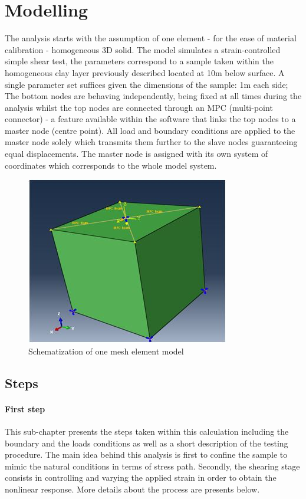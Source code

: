 \documentclass[10pt,a4paper]{report}
\begin{document}
\section{Modelling}

The analysis starts with the assumption of one element - for the ease of material calibration - homogeneous 3D solid. The model simulates a strain-controlled simple shear test, the parameters correspond to a sample taken within the homogeneous clay layer previously described located at 10m below surface. A single parameter set suffices given the dimensions of the sample: 1m each side; The bottom nodes are behaving independently, being fixed at all times during the analysis whilst the top nodes are connected through an MPC (multi-point connector) - a feature available within the software that links the top nodes to a master node (centre point). All load and boundary conditions are applied to the master node solely which transmits them further to the slave nodes guaranteeing equal displacements. The master node is assigned with its own system of coordinates which corresponds to the whole model system.

\begin{figure}[h!]
	\centering
	\includegraphics[width=0.7\linewidth]{"1dmodel"}
	\caption{Schematization of one mesh element model }
	\label{cube}
\end{figure}

\subsection{Steps}
\paragraph{First step}
This sub-chapter presents the steps taken within this calculation including the boundary and the loads conditions as well as a short description of the testing procedure. The main idea behind this analysis is first to confine the sample to mimic the natural conditions in terms of stress path. Secondly, the shearing stage consists in controlling and varying the applied strain in order to obtain the nonlinear response. More details about the process are presents below. 
\end{document}
